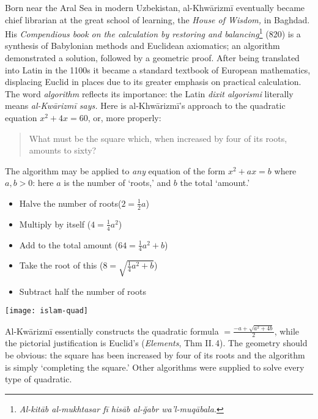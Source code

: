	
Born near the Aral Sea in modern Uzbekistan, al-Khwārizmī eventually became chief librarian at the great school of learning, the \emph{House of Wisdom,} in Baghdad. His \emph{Compendious book on the calculation by restoring and balancing}\footnote{\emph{Al-kitāb al-mukhtasar fī hisāb al-ğabr wa’l-muqābala.}} (820) is a synthesis of Babylonian methods and Euclidean axiomatics; an algorithm demonstrated a solution, followed by a geometric proof. After being translated into Latin in the 1100s it became a standard textbook of European mathematics, displacing Euclid in places due to its greater emphasis on practical calculation. The word \emph{algorithm} reflects its importance: the Latin \emph{dixit algorismi} literally means \emph{al-Kwārizmī says.}\medbreak
Here is al-Khwārizmī's approach to the quadratic equation $x^2+4x=60$, or, more properly:
\begin{quote}
	What must be the square which, when increased by four of its roots, amounts to sixty?
\end{quote}


\begin{minipage}[t]{0.7\linewidth}\vspace{-4pt}
	The algorithm may be applied to \emph{any} equation of the form $x^2+ax=b$ where $a,b>0$: here $a$ is the number of `roots,' and $b$ the total `amount.'
	\begin{itemize}\itemsep0pt
	  \item Halve the number of roots\hfill \big($2=\frac 12a$\big)
	  \item Multiply by itself \hfill \big($4=\frac 14a^2$\big)
	  \item Add to the total amount \hfill \big($64=\frac 14a^2+b$\big)
	  \item Take the root of this \hfill \Big($8=\sqrt{\frac 14a^2+b}$\Big)
	  \item Subtract half the number of roots \hfill {}
	\end{itemize}
\end{minipage}
\hfill
\begin{minipage}[t]{0.29\linewidth}\vspace{-3pt}
	\flushright
	\texttt{[image: islam-quad]}
\end{minipage}
\smallbreak
Al-Kwārizmī essentially constructs the quadratic formula $=\frac{-a+\sqrt{a^2+4b}}2$, while the pictorial justification is Euclid's (\emph{Elements}, Thm II.\,4). The geometry should be obvious: the square has been increased by four of its roots and the algorithm is simply `completing the square.'\smallbreak
Other algorithms were supplied to solve every type of quadratic.
\goodbreak

